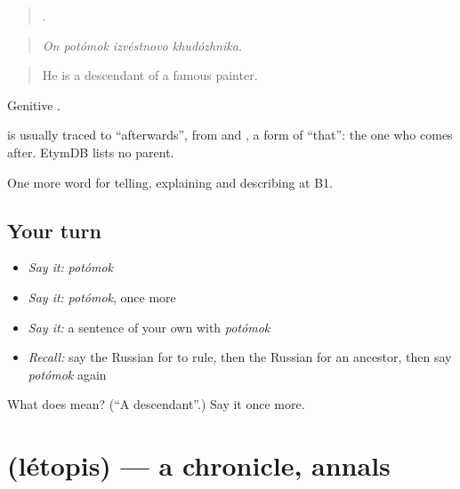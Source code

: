 \begin{quote}
   .
\end{quote}

\begin{quote}
\emph{On potómok izvéstnovo khudózhnika.}
\end{quote}

\begin{quote}
He is a descendant of a famous painter.
\end{quote}

Genitive \emph{}.

\begin{cousinweb}
\emph{} is usually traced to \emph{} \textquotedblleft{}afterwards\textquotedblright{}, from \emph{} and \emph{}, a form of \emph{} \textquotedblleft{}that\textquotedblright{}: the one who comes after. EtymDB lists no parent.
\end{cousinweb}

\begin{grammarlens}[title={What you've built}]
One more word for telling, explaining and describing at B1.
\end{grammarlens}

\subsection*{Your turn}
\begin{itemize}
\raggedright
  \item \emph{Say it:} \emph{potómok}
  \item \emph{Say it:} \emph{potómok}, once more
  \item \emph{Say it:} a sentence of your own with \emph{potómok}
  \item \emph{Recall:} say the Russian for to rule, then the Russian for an ancestor, then say \emph{potómok} again
\end{itemize}

\begin{tcolorbox}[breakable,colback=teal!4,colframe=teal!35!black,title={Before you move on}]
What does  mean? (\textquotedblleft{}A descendant\textquotedblright{}.) Say it once more.
\end{tcolorbox}
\section[\texorpdfstring{\ru{летопись} (létopis)}{летопись (létopis)}]{ (létopis) — a chronicle, annals}

